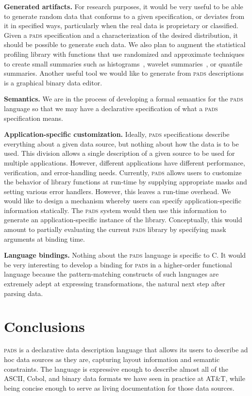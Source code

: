 \documentclass{sigplanconf}
\newcommand{\pads}{\textsc{pads}}
\newcommand{\C}{\textsc{C}}
\begin{document}
\textbf{Generated artifacts.} 
For research purposes, it would be very useful to be able to generate random data that conforms to a given specification, or 
deviates from it in specified ways, particularly when the real data is proprietary or classified. 
Given a \pads{} specification and a characterization of the desired distribution, it should be possible to generate such data.  We also plan to augment the statistical profiling library with
functions that use randomized and approximate techniques to create
small summaries such as histograms~\cite{histograms-wavelets,histograms}, wavelet summaries~\cite{histograms-wavelets},
or quantile summaries\cite{quantiles}.
Another useful tool we 
would like to generate from \pads{} descriptions is a graphical binary data editor. 

\textbf{Semantics.}  We are in the process of developing a formal semantics for the \pads{} language so that we may have a declarative specification of what a \pads{} specification means. 

\textbf{Application-specific customization.}
Ideally, \pads{} specifications describe everything about a given
data source, but nothing about how the data is to be used. This
division allows a single description of a given source to be used
for multiple applications.  However, different applications have different
performance, verification, and error-handling needs.  Currently,
\pads{} allows users to customize the behavior of library
functions at run-time by supplying appropriate masks and setting various error handlers.  However, this leaves a run-time overhead.  We would like to 
design a mechanism whereby users can specify application-specific information statically.  The \pads{} system would then use this information to generate an 
application-specific instance of the library.  Conceptually, this would
amount to partially evaluating the current \pads{} library by specifying mask arguments at binding time.

\textbf{Language bindings.}  Nothing about the \pads{} language is specific to \C{}.  It would be very interesting to develop a binding for \pads{} in a higher-order functional language because the pattern-matching constructs of such languages are extremely adept at expressing transformations, the natural next step after parsing data.


\section{Conclusions}
\pads{} is a declarative data description language that allows 
its users to describe ad hoc data sources as they are, capturing
layout information and semantic constraints.  The language
is expressive enough to describe almost all of the ASCII, Cobol, 
and binary data formats we have seen in practice at AT\&T, while being 
concise enough to serve as living documentation for those data sources.  
\end{document}

